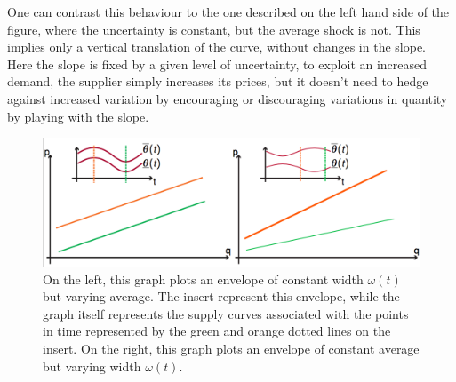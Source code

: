 One can contrast this behaviour to the one described on the left hand side of the figure, where the uncertainty is constant, but the average shock is not. This implies only a vertical translation of the curve, without changes in the slope. Here the slope is fixed by a given level of uncertainty, to exploit an increased demand, the supplier simply increases its prices, but it doesn't need to hedge against increased variation by encouraging or discouraging variations in quantity by playing with the slope.\\



\begin{figure}[h] 
\centering
\includegraphics[width=15cm]{figch1/uncertainty.png}
\caption{\small{On the left, this graph plots an envelope of constant width $\omega(t)$ but varying average. The insert represent this envelope, while the graph itself represents the supply curves associated with the points in time represented by the green and orange dotted lines on the insert. On the right, this graph plots an envelope of constant average but varying width $\omega(t)$. }} \label{figdyn1}
\end{figure}

